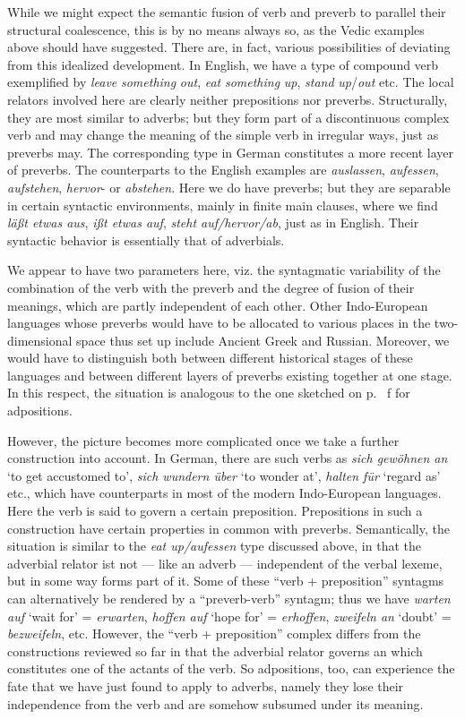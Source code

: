 While we might expect the semantic fusion of verb and preverb to parallel their structural coalescence, this is by no means always so, as the Vedic examples above should have suggested. There are, in fact, various possibilities of deviating from this idealized development. In English, we have a type of compound verb exemplified by \textit{leave} \textit{something} \textit{out}, \textit{eat} \textit{something} \textit{up}, \textit{stand} \textit{up}/\textit{out} etc. The local relators involved here are clearly neither prepositions nor preverbs. Structurally, they are most similar to adverbs; but they form part of a discontinuous complex verb and may change the meaning of the simple verb in irregular ways, just as preverbs may. The corresponding type in German constitutes a more recent layer of preverbs. The counterparts to the English examples are \textit{auslassen}, \textit{aufessen}, \textit{aufstehen}, \textit{hervor}{}- or \textit{abstehen}. Here we do have preverbs; but they are separable in certain syntactic environments, mainly in finite main clauses, where we find \textit{läßt etwas aus}, \textit{ißt etwas auf}, \textit{steht auf/hervor/ab}, just as in English. Their syntactic behavior is essentially that of adverbials.

We appear to have two parameters here, viz. the syntagmatic variability of the combination of the verb with the preverb and the degree of fusion of their meanings, which are partly independent of each other. Other Indo-European languages whose preverbs would have to be allocated to various places in the two-dimensional space thus set up include Ancient Greek and Russian. Moreover, we would have to distinguish both between different historical stages of these languages and between different layers of preverbs existing together at one stage. In this respect, the situation is analogous to the one sketched on p.~\pageref{page102}%
f for adpositions.

However, the picture becomes more complicated once we take a further construction into account. In German, there are such verbs as \textit{sich gewöhnen an} ‘to get accustomed to’, \textit{sich wundern über} ‘to wonder at’, \textit{halten für} ‘regard as’ etc., which have counterparts in most of the modern Indo-European languages. Here the verb is said to govern a certain preposition. Prepositions in such a construction have certain properties in common with preverbs. Semantically, the situation is similar to the \textit{eat up/aufessen} type discussed above, in that the adverbial relator ist not — like an adverb — independent of the verbal lexeme, but in some way forms part of it. Some of these ``verb + preposition'' syntagms can alternatively be rendered by a ``preverb-verb'' syntagm; thus we have \textit{warten auf} ‘wait for’ = \textit{erwarten}, \textit{hoffen auf} ‘hope for’ = \textit{erhoffen}, \textit{zweifeln an} ‘doubt’ = \textit{bezweifeln}, etc. However, the ``verb + preposition'' complex differs from the constructions reviewed so far in that the adverbial relator governs an \np which constitutes one of the actants of the verb. So adpositions, too, can experience the fate that we have just found to apply to adverbs, namely they lose their independence from the verb and are somehow subsumed under its meaning.

